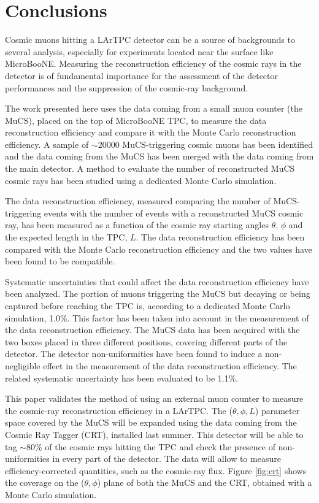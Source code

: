 \documentclass[a4paper,11pt]{article}
\begin{document}
\section{Conclusions}
Cosmic muons hitting a LArTPC detector can be a source of backgrounds to several analysis, especially for experiments located near the surface like MicroBooNE. Measuring the reconstruction efficiency of the cosmic rays in the detector is of fundamental importance for the assessment of the detector performances and the suppression of the cosmic-ray background.

The work presented here uses the data coming from a small muon counter (the MuCS), placed on the top of MicroBooNE TPC, to measure the data reconstruction efficiency and compare it with the Monte Carlo reconstruction efficiency.
A sample of $\sim$20000 MuCS-triggering cosmic muons has been identified and the data coming from the MuCS has been merged with the data coming from the main detector. A method to evaluate the number of reconstructed MuCS cosmic rays has been studied using a dedicated Monte Carlo simulation.

The data reconstruction efficiency, measured comparing the number of MuCS-triggering events with the number of events with a reconstructed MuCS cosmic ray, has been measured as a function of the cosmic ray starting angles $\theta$, $\phi$ and the expected length in the TPC, $L$. The data reconstruction efficiency has been compared with the Monte Carlo reconstruction efficiency and the two values have been found to be compatible.

Systematic uncertainties that could affect the data reconstruction efficiency have been analyzed. The portion of muons triggering the MuCS but decaying or being captured before reaching the TPC is, according to a dedicated Monte Carlo simulation, 1.0\%. This factor has been taken into account in the measurement of the data reconstruction efficiency.
The MuCS data has been acquired with the two boxes placed in three different positions, covering different parts of the detector. The detector non-uniformities have been found to induce a non-negligible effect in the measurement of the data reconstruction efficiency. The related systematic uncertainty has been evaluated to be 1.1\%.

This paper validates the method of using an external muon counter to measure the cosmic-ray reconstruction efficiency in a LArTPC. The ($\theta, \phi, L$) parameter space covered by the MuCS will be expanded using the data coming from the Cosmic Ray Tagger (CRT), installed last summer. This detector will be able to tag $\sim$80\% of the cosmic rays hitting the TPC and check the presence of non-uniformities in every part of the detector. The data will allow to measure efficiency-corrected quantities, such as the cosmic-ray flux. Figure \ref{fig:crt} shows the coverage on the ($\theta,\phi$) plane of both the MuCS and the CRT, obtained with a Monte Carlo simulation.
\end{document}
